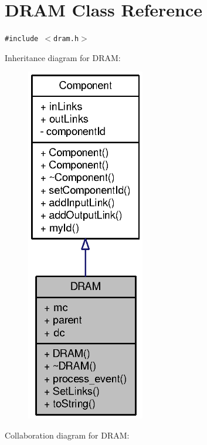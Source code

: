 \section{DRAM Class Reference}
\label{classDRAM}
{\tt \#include $<$dram.h$>$}

Inheritance diagram for DRAM:\nopagebreak
\begin{figure}[H]
\begin{center}
\leavevmode
\includegraphics[width=146pt]{classDRAM__inherit__graph}
\end{center}
\end{figure}
Collaboration diagram for DRAM:\nopagebreak

